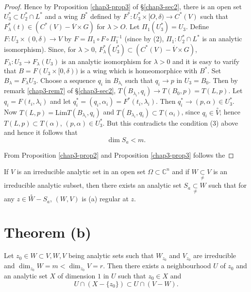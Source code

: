 \begin{proof}
Hence by Proposition \ref{chap3-prop3} of \S \ref{chap3-sec2}, there
is an open set $U^*_3 \subset 
U^*_2 \cap L^*$ and a wing $B^*$ defined by $F^*: U^*_3 \times
[O,\delta)\to C^*(V)$ such that $F^*_\lambda (t)\in
(C^*(V)-\overset{.}{V}\times G)$ for $\lambda > O$. Let $\Pi_1
(U^*_3)=U_3$. Define $F:U_3 \times (0,\delta)\to V$ by $F =
\Pi_1 \circ F \circ \Pi^{-1}_1$ (since by (2), $\Pi_1:U^*_2 \cap L^*$ 
is an analytic isomorphism). Since, for $\lambda > 0$, $F^*_\lambda
(U^*_3)\subset (C^*(V) - \overset{.}{V}\times G)$, ${F}_\lambda :
   {U_3}\to {F}_\lambda ({U_3})$ is an analytic isomorphism
   for $\lambda > 0$ and it is  easy to varify that $B=F({U}_3
   \times [0,\delta))$ is a wing  which  is homeomorphice with
   $B^\ast$. Set  ${B}_\lambda={F}_\lambda {U_3}$. Choose a sequence
   $q_i$ in  ${B}_{\lambda_i}$ such that ${q}_i \to p$ in
   ${U}_3= {B}_0$. Then  by remark \ref{chap3-rem7} of \S \ref{chap3-sec2},
   $T({B}_{\lambda_i},{q}_i)\to {T}(B_0,{p})={T}({L,p})$. Let
   ${q}_i={F}(t_i,\lambda_i)$ and let ${q}_i^\ast =({q_i, \alpha_i})=
   {F}^\ast(t_i, \lambda_i)$. Then  $q_i^\ast \to
   (p,\alpha)\in {U}_3^\ast$. Now  ${T(L,p)}= \text{Lim}
   T(B_{\lambda_i},q_i)$ and  ${T}(B_{\lambda_i},q_i) \subset
   {T}(\alpha_i)$, since ${q}_i \in \overset{\circ}{V}$; hence
   $T(L,p)\subset {T}(\alpha)$, $(p, \alpha)\in U_3^\ast$. But this
   contradicts the condition (3) above and hence it follows that 
   $$
   \dim S_a < m.
   $$

   From  Proposition  \ref{chap3-prop2} and  Proposition
   \ref{chap3-prop3} follows the  
\end{proof}

\begin{theorem*}[(a)(Whitney).]
  If $V$ is an irreducible analytic set in an open set $\Omega
  \subset \mathbb{C}^n$ and  if $W\underset{\neq}{\subset} 
  V$ is an  irreducible  analytic  subset, then there  exists  an
  analytic set $S_a \underset{\neq}{\subset} W$ such that for any $z
  \in \overset{\circ}{W} -S_a$, $(W,V)$ is  (a) regular at $z$. 
\end{theorem*}

\section{Theorem (b)}\label{chap3-sec4}\pageoriginale

\begin{lemma}\label{chap3-lem4} %
  Let ${z_0}\in {W}\subset {V,W,V}$ being  analytic sets such that
  $W_{z_0}$ and $V_{z_0}$ are irreducible  and ${\dim}_{z_0} W = m <
  {\dim}_{z_0} V=r$. Then there  exists  a neighbourhood  $U$ of $z_0$
  and an analytic  set  $X$ of  dimension  $1$ in $U$ such  that $z_0
  \in X$ and  
  $$
  U\cap (X-\{z_0\})\subset U \cap (V-W).
  $$
\end{lemma}

